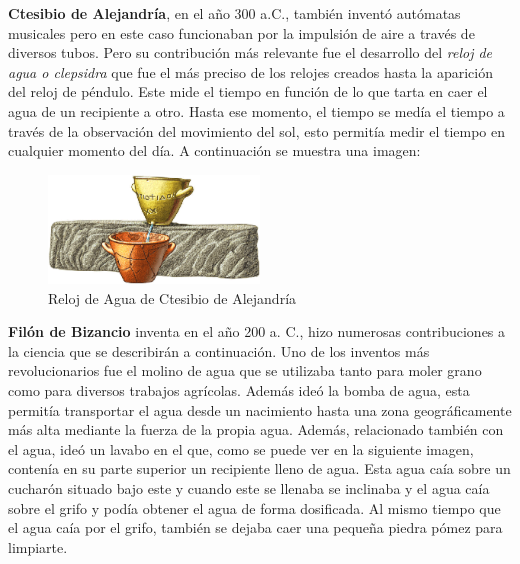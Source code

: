 \textbf{Ctesibio de Alejandría}, en el año 300 a.C., también inventó autómatas musicales pero en este caso funcionaban por la impulsión de aire a través de diversos tubos. Pero su contribución más relevante fue el desarrollo del \textit{reloj de agua o clepsidra} que fue el más preciso de los relojes creados hasta la aparición del reloj de péndulo. Este mide el tiempo en función de lo que tarta en caer el agua de un recipiente a otro. Hasta ese momento, el tiempo se medía el tiempo a través de la observación del movimiento del sol, esto permitía medir el tiempo en cualquier momento del día. A continuación se muestra una imagen:\\

	
\begin{figure}[H]
\begin{center}
  \includegraphics[width=0.5\textwidth]{./EtapaPrimeriza/imagenes/reloj.png}
  \caption{Reloj de Agua de Ctesibio de Alejandría}
  \label{reloj}
\end{center}
\end{figure}



\textbf{Filón de Bizancio} inventa en el año 200 a. C., hizo numerosas contribuciones a la ciencia que se describirán a continuación. Uno de los inventos más revolucionarios fue el molino de agua que se utilizaba tanto para moler grano como para diversos trabajos agrícolas. Además ideó la bomba de agua, esta permitía transportar el agua desde un nacimiento hasta una zona geográficamente más alta mediante la fuerza de la propia agua. Además, relacionado también con el agua, ideó un lavabo en el que, como se puede ver en la siguiente imagen, contenía en su parte superior un recipiente lleno de agua. Esta agua caía sobre un cucharón situado bajo este y cuando este se llenaba se inclinaba y el agua caía sobre el grifo y podía obtener el agua de forma dosificada. Al mismo tiempo que el agua caía por el grifo, también se dejaba caer una pequeña piedra pómez para limpiarte.\\


